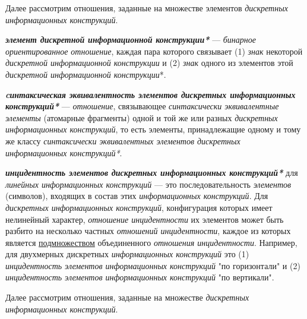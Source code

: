 Далее рассмотрим отношения, заданные на множестве элементов \textit{дискретных информационных конструкций}.

\begin{SCn}


\end{SCn}

\textit{\textbf{элемент дискретной информационной конструкции*}} --- \textit{бинарное ориентированное отношение}, каждая пара которого связывает (1) \textit{знак} некоторой \textit{дискретной информационной конструкции} и (2) \textit{знак} одного из элементов этой \textit{дискретной информационной конструкции}*.

\textit{\textbf{cинтаксическая эквивалентность элементов дискретных информационных конструкций*}} --- \textit{отношение}, связывающее \textit{синтаксически эквивалентные элементы} (атомарные фрагменты) одной и той же или разных \textit{дискретных информационных конструкций}, то есть элементы, принадлежащие одному и тому же классу \textit{синтаксически эквивалентных элементов дискретных информационных конструкций*}.

\textit{\textbf{инцидентность элементов дискретных информационных конструкций*}} для \textit{линейных информационных конструкций} --- это последовательность \textit{элементов} (символов), входящих в состав этих \textit{информационных конструкций}.
Для \textit{дискретных информационных конструкций}, конфигурация которых имеет нелинейный характер, \textit{отношение инцидентности} их элементов может быть разбито на несколько частных \textit{отношений инцидентности}, каждое из которых является \underline{подмножеством} объединенного \textit{отношения инцидентности}.
Например, для двухмерных дискретных \textit{информационных конструкций} это (1) \textit{инцидентность элементов информационных конструкций} "по горизонтали"{} и (2) \textit{инцидентность элементов информационных конструкций} "по вертикали"{}.

Далее рассмотрим отношения, заданные на множестве \textit{дискретных информационных конструкций}.

